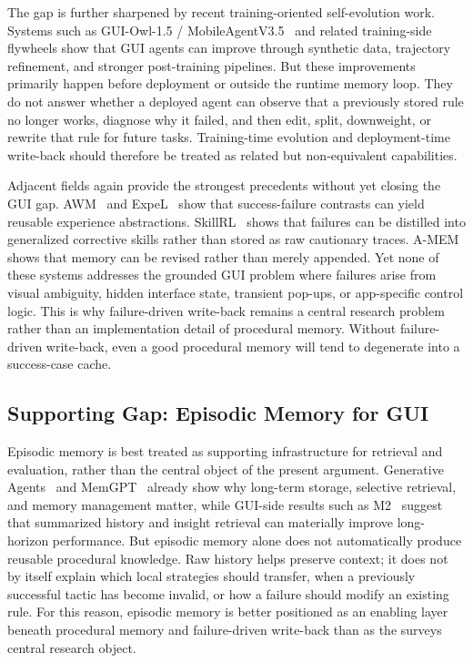 \documentclass{article}
\begin{document}
The gap is further sharpened by recent training-oriented self-evolution
work. Systems such as GUI-Owl-1.5 /
MobileAgentV3.5~\parencite{xu2026mobileagentv35multiplatformfundamentalgui} and related
training-side flywheels show that GUI agents can improve through
synthetic data, trajectory refinement, and stronger post-training
pipelines. But these improvements primarily happen before deployment or
outside the runtime memory loop. They do not answer whether a deployed
agent can observe that a previously stored rule no longer works,
diagnose why it failed, and then edit, split, downweight, or rewrite
that rule for future tasks. Training-time evolution and deployment-time
write-back should therefore be treated as related but non-equivalent
capabilities.

Adjacent fields again provide the strongest precedents without yet
closing the GUI gap. AWM~\parencite{wang2024agentworkflowmemory} and
ExpeL~\parencite{zhao2024expelllmagentsexperiential} show that success-failure contrasts can
yield reusable experience abstractions. SkillRL~\parencite{xia2026skillrlevolvingagentsrecursive}
shows that failures can be distilled into generalized corrective skills
rather than stored as raw cautionary traces.
A-MEM~\parencite{xu2025amemagenticmemoryllm} shows that memory can be revised rather
than merely appended. Yet none of these systems addresses the grounded
GUI problem where failures arise from visual ambiguity, hidden
interface state, transient pop-ups, or app-specific control logic. This
is why failure-driven write-back remains a central research problem
rather than an implementation detail of procedural memory. Without
failure-driven write-back, even a good procedural memory will tend to
degenerate into a success-case cache.

\subsection{Supporting Gap: Episodic Memory for GUI}\label{63-supporting-gap-episodic-memory-for-gui}

Episodic memory is best treated as supporting infrastructure for
retrieval and evaluation, rather than the central object of the present
argument. Generative Agents~\parencite{park2023generativeagentsinteractivesimulacra} and
MemGPT~\parencite{packer2024memgptllmsoperatingsystems} already show why long-term storage,
selective retrieval, and memory management matter, while GUI-side
results such as
M2~\parencite{yan2026m2dualmemoryaugmentationlonghorizon} suggest that summarized history and insight
retrieval can materially improve long-horizon performance. But episodic
memory alone does not automatically produce reusable procedural
knowledge. Raw history helps preserve context; it does not by itself
explain which local strategies should transfer, when a previously
successful tactic has become invalid, or how a failure should modify an
existing rule. For this reason, episodic memory is better positioned as
an enabling layer beneath procedural memory and failure-driven
write-back than as the survey\textquotesingle s central research
object.
\end{document}
